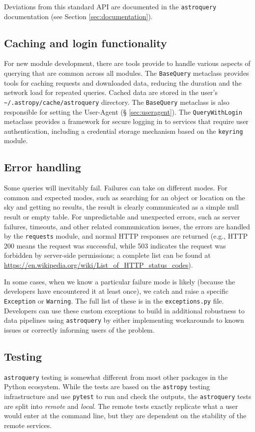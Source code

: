 \documentclass[twocolumn]{aastex62}
\newcommand{\package}[1]{\texttt{#1}\xspace}
\newcommand{\astroquery}{\package{astroquery}}
\newcommand{\astropypkg}{\package{astropy}}
\begin{document}
Deviations from this standard API are documented in the \astroquery
documentation (see Section \ref{sec:documentation}).

\subsection{Caching and login functionality}
For new module development, there are tools provide to handle various aspects
of querying that are common across all modules.  The \texttt{BaseQuery}
metaclass provides tools for caching requests and downloaded data, reducing the
duration and the network load for repeated queries.  Cached data are
stored in the user's \texttt{\textasciitilde/.astropy/cache/astroquery} directory.  The
\texttt{BaseQuery} metaclass is also responsible for setting the User-Agent (\S
\ref{sec:useragent}).  The \texttt{QueryWithLogin} metaclass provides a
framework for secure logging in to services that require user authentication,
including a credential storage mechanism based on the \texttt{keyring} module.

\subsection{Error handling}
Some queries will inevitably fail.  Failures can take on different modes.  For
common and expected modes, such as searching for an object or location on the
sky and getting no results, the result is clearly communicated as a simple null
result or empty table.  For unpredictable and unexpected errors, such as server
failures, timeouts, and other related communication issues, the errors are handled
by the \texttt{requests} module, and normal HTTP responses are returned (e.g.,
HTTP 200 means the request was successful, while 503 indicates the request
was forbidden by server-side permissions;  a complete list can be found at
\url{https://en.wikipedia.org/wiki/List_of_HTTP_status_codes}).

In some cases, when we know a particular failure mode is likely (because the
developers have encountered it at least once), we catch and raise a specific
\texttt{Exception} or \texttt{Warning}.  The full list of these is in the 
\texttt{exceptions.py} file.  Developers can use these custom exceptions
to build in additional robustness to data pipelines using \astroquery
by either implementing workarounds to known issues or correctly informing
users of the problem.

\subsection{Testing}
\astroquery testing is somewhat different from most other packages in the Python
ecosystem.  While the tests are based on the \astropypkg testing infrastructure and use
\package{pytest} to run and check the outputs, the \astroquery tests are split into
\emph{remote} and \emph{local}.  The remote tests exactly replicate what a user
would enter at the command line, but they are dependent on the stability of the
remote services.
\end{document}
